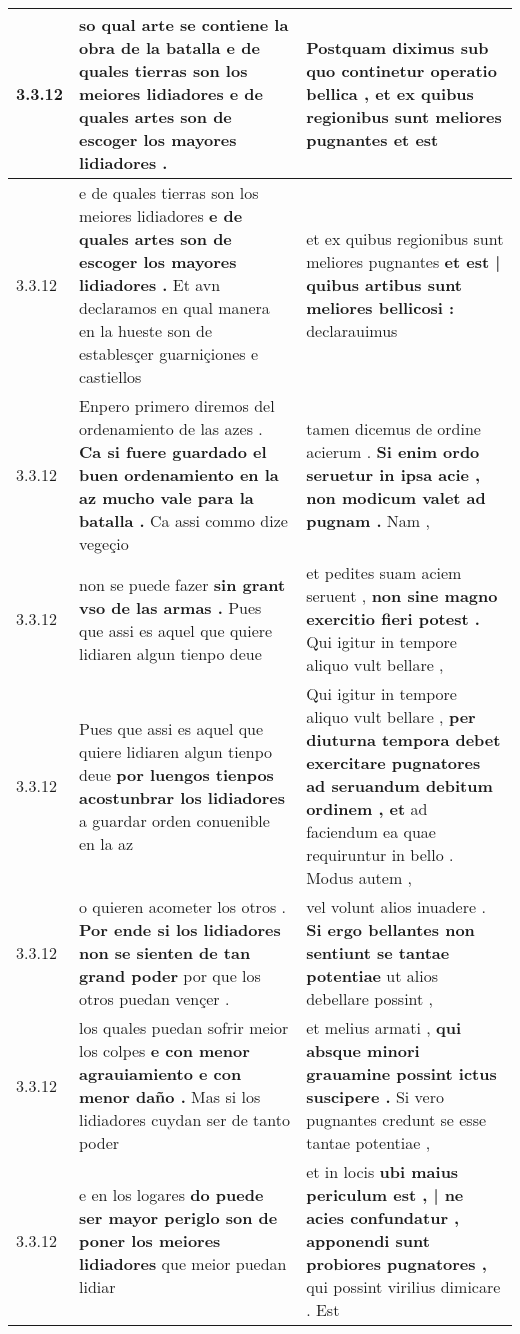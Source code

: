 \begin{tabular}{|p{1cm}|p{6.5cm}|p{6.5cm}|}
3.3.12 & so qual arte se contiene la obra de la batalla \textbf{ e de quales tierras son los meiores lidiadores } e de quales artes son de escoger los mayores lidiadores . & Postquam diximus sub quo continetur operatio bellica , \textbf{ et ex quibus regionibus sunt meliores pugnantes } et est \\\hline
3.3.12 & e de quales tierras son los meiores lidiadores \textbf{ e de quales artes son de escoger los mayores lidiadores . } Et avn declaramos en qual manera en la hueste son de establesçer guarniçiones e castiellos & et ex quibus regionibus sunt meliores pugnantes \textbf{ et est | quibus artibus sunt meliores bellicosi : } declarauimus \\\hline
3.3.12 & Enpero primero diremos del ordenamiento de las azes . \textbf{ Ca si fuere guardado el buen ordenamiento en la az mucho vale para la batalla . } Ca assi commo dize vegeçio & tamen dicemus de ordine acierum . \textbf{ Si enim ordo seruetur in ipsa acie , non modicum valet ad pugnam . } Nam , \\\hline
3.3.12 & non se puede fazer \textbf{ sin grant vso de las armas . } Pues que assi es aquel que quiere lidiaren algun tienpo deue & et pedites suam aciem seruent , \textbf{ non sine magno exercitio fieri potest . } Qui igitur in tempore aliquo vult bellare , \\\hline
3.3.12 & Pues que assi es aquel que quiere lidiaren algun tienpo deue \textbf{ por luengos tienpos acostunbrar los lidiadores } a guardar orden conuenible en la az & Qui igitur in tempore aliquo vult bellare , \textbf{ per diuturna tempora debet exercitare pugnatores ad seruandum debitum ordinem , et } ad faciendum ea quae requiruntur in bello . Modus autem , \\\hline
3.3.12 & o quieren acometer los otros . \textbf{ Por ende si los lidiadores non se sienten de tan grand poder } por que los otros puedan vençer . & vel volunt alios inuadere . \textbf{ Si ergo bellantes non sentiunt se tantae potentiae } ut alios debellare possint , \\\hline
3.3.12 & los quales puedan sofrir meior los colpes \textbf{ e con menor agrauiamiento e con menor daño . } Mas si los lidiadores cuydan ser de tanto poder & et melius armati , \textbf{ qui absque minori grauamine possint ictus suscipere . } Si vero pugnantes credunt se esse tantae potentiae , \\\hline
3.3.12 & e en los logares \textbf{ do puede ser mayor periglo son de poner los meiores lidiadores } que meior puedan lidiar & et in locis \textbf{ ubi maius periculum est , | ne acies confundatur , apponendi sunt probiores pugnatores , } qui possint virilius dimicare . Est \\\hline

\end{tabular}
